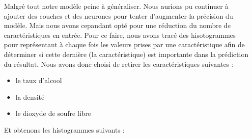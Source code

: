 \vspace{1cm}

Malgré tout notre modèle peine à généraliser. Nous aurions pu continuer à ajouter des couches et des neurones
pour tenter d'augmenter la précision du modèle. Mais nous avons cepandant opté pour une réduction du nombre de
caractéristiques en entrée. Pour ce faire, nous avons tracé des hisotogrammes pour représentant à chaque fois
les valeurs prises par une caractéristique afin de déterminer si cette dernière (la caractéristique) est importante
dans la prédiction du résultat. Nous avons donc choisi de retirer les caractéristiques suivantes :

\newpage

\begin{itemize}
    \item le taux d'alcool
    \item la densité
    \item le dioxyde de soufre libre
\end{itemize}

\vspace{1cm}

Et obtenons les histogrammes suivants :

\vspace{1cm}


